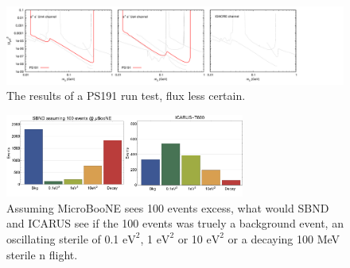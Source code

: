 \documentclass[11pt, a4paper]{article}
\begin{document}
\begin{figure}[t]
\center
\includegraphics[width=1.0\textwidth]{figures/zerobg_um4_ps191_test.pdf}
\caption{The results of a PS191 run test, flux less certain.}
\end{figure}

	
\begin{figure}[t]
\center
\includegraphics[width=0.7\textwidth]{figures/baseline_comp.pdf}
\caption{\label{fig:baseline_comp} Assuming MicroBooNE sees 100 events excess, what would SBND and ICARUS see if the 100 events was truely a background event, an oscillating sterile of 0.1 $\text{eV}^2$, 1  $\text{eV}^2$ or 10 $\text{eV}^2$ or a decaying 100 MeV sterile n flight. }
\end{figure}




{}
\end{document}
